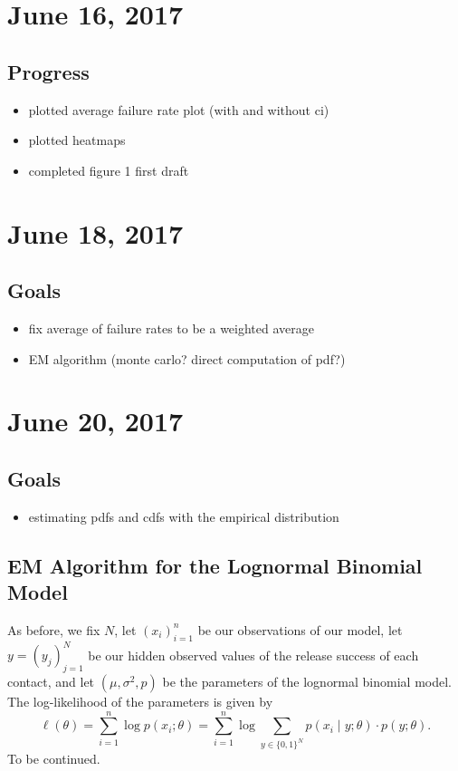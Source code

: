 \documentclass{article}
\begin{document}
\section{June 16, 2017}
\subsection{Progress}
\begin{itemize}
  \item plotted average failure rate plot (with and without ci)
  \item plotted heatmaps
  \item completed figure 1 first draft
\end{itemize}

\section{June 18, 2017}
\subsection{Goals}
\begin{itemize}
  \item fix average of failure rates to be a weighted average
  \item EM algorithm (monte carlo? direct computation of pdf?)
\end{itemize}

\section{June 20, 2017}
\subsection{Goals}
\begin{itemize}
  \item estimating pdfs and cdfs with the empirical distribution
\end{itemize}

\subsection{EM Algorithm for the Lognormal Binomial Model}
As before, we fix $N$, let $(x_i)_{i=1}^n$ be our observations of our model, let $y=(y_j)_{j=1}^N$ be our hidden observed values of the release success of each contact, and let $(\mu, \sigma^2, p)$ be the parameters of the lognormal binomial model. The log-likelihood of the parameters is given by
\[
  \ell(\theta) = \sum_{i=1}^n \log p(x_i;\theta) = \sum_{i=1}^n \log\sum_{y\in\{0,1\}^N} p(x_i\mid y;\theta)\cdot p(y;\theta).
\]
To be continued.
\end{document}
